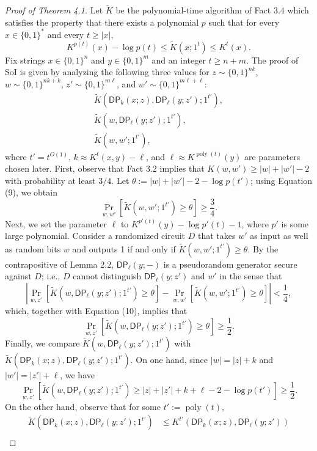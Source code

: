 \begin{proof}[Proof of Theorem 4.1]
Let $\widetilde K$ be the polynomial-time algorithm of Fact 3.4 which satisfies the property that there exists a polynomial $p$ such that for every $x\in\{0,1\}^*$ and every $t\geq|x|$,
\[K^{p(t)}(x)-\log p(t)\leq\widetilde K(x;1^t)\leq K^t(x).\tag{9}\]
Fix strings $x\in\{0,1\}^n$ and $y\in\{0,1\}^m$ and an integer $t\geq n+m$. The proof of SoI is given by analyzing the following three values for $z\sim\{0,1\}^{nk}$, $w\sim\{0,1\}^{nk+k}$, $z'\sim\{0,1\}^{m\ell}$, and $w'\sim\{0,1\}^{m\ell+\ell}$:
\[\begin{gathered}
\widetilde K(\mathsf{DP}_k(x;z),\mathsf{DP}_\ell(y;z');1^{t'}),\\
\widetilde K(w,\mathsf{DP}_\ell(y;z');1^{t'}),\\
\widetilde K(w,w';1^{t'}),
\end{gathered}\]
where $t'=t^{O(1)}$, $k\approx K^t(x,y)-\ell$, and $\ell\approx K^{\operatorname{poly}(t)}(y)$ are parameters chosen later.
First, observe that Fact 3.2 implies that $K(w,w')\geq|w|+|w'|-2$ with probability at least $3/4$. Let $\theta:=|w|+|w'|-2-\log p(t')$; using Equation (9), we obtain
\[\Pr_{w,w'}[\widetilde K(w,w';1^{t'})\geq\theta]\geq\frac34.\tag{10}\]
Next, we set the parameter $\ell$ to $K^{p'(t)}(y)-\log p'(t)-1$, where $p'$ is some large polynomial. Consider a randomized circuit $D$ that takes $w'$ as input as well as random bits $w$ and outputs 1 if and only if $\widetilde K(w,w';1^{t'})\geq\theta$. By the contrapositive of Lemma 2.2, $\mathsf{DP}_\ell(y;-)$ is a pseudorandom generator secure against $D$; i.e., $D$ cannot distinguish $\mathsf{DP}_\ell(y;z')$ and $w'$ in the sense that
\[\left|\Pr_{w,z'}[\widetilde K(w,\mathsf{DP}_\ell(y;z');1^{t'})\geq\theta]-\Pr_{w,w'}[\widetilde K(w,w';1^{t'})\geq\theta]\right|<\frac14,\]
which, together with Equation (10), implies that
\[\Pr_{w,z'}[\widetilde K(w,\mathsf{DP}_\ell(y;z');1^{t'})\geq\theta]\geq\frac12.\]
Finally, we compare $\widetilde K(w,\mathsf{DP}_\ell(y;z');1^{t'})$ with $\widetilde K(\mathsf{DP}_k(x;z),\mathsf{DP}_\ell(y;z');1^{t'})$. On one hand, since $|w|=|z|+k$ and $|w'|=|z'|+\ell$, we have
\[\Pr_{w,z'}[\widetilde K(w,\mathsf{DP}_\ell(y;z');1^{t'})\geq|z|+|z'|+k+\ell-2-\log p(t')]\geq\frac12.\tag{11}\]
On the other hand, observe that for some $t':=\operatorname{poly}(t)$,
\begin{align*}
\widetilde K(\mathsf{DP}_k(x;z),\mathsf{DP}_\ell(y;z');1^{t'})
&\leq K^{t'}(\mathsf{DP}_k(x;z),\mathsf{DP}_\ell(y;z'))\\

\end{align*}
\end{proof}
